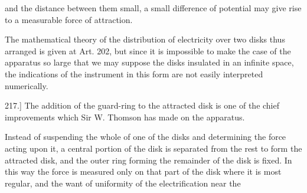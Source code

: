 \documentclass[11pt,a4paper]{article}
\begin{document}
\clearpage

and the distance between them small, a small difference of potential
may give rise to a measurable force of attraction.

The mathematical theory of the distribution of electricity over
two disks thus arranged is given at Art. 202, but since it is impossible
to make the case of the apparatus so large that we may suppose the
disks insulated in an infinite space, the indications of the instrument
in this form are not easily interpreted numerically.

217.] The addition of the guard-ring to the attracted disk is one
of the chief improvements which Sir W. Thomson has made on the
apparatus.

Instead of suspending the whole of one of the disks and determining
the force acting upon it, a central portion of the disk is separated
from the rest to form the attracted disk, and the outer ring forming
the remainder of the disk is fixed. In this way the force is measured
only on that part of the disk where it is most regular, and the want
of uniformity of the electrification near the
\end{document}
